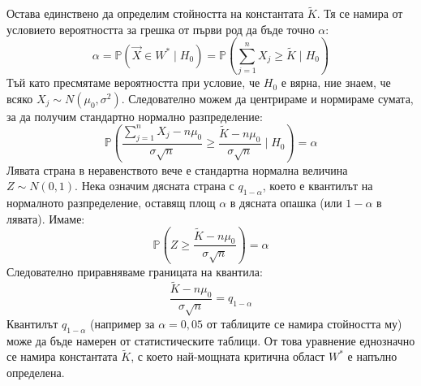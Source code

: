 \documentclass{article}
\begin{document}
Остава единствено да определим стойността на константата $\tilde{K}$. Тя се намира от условието вероятността за грешка от първи род да бъде точно $\alpha$:
\[
\alpha = \mathbb{P}(\vec{X} \in W^* \mid H_0) = \mathbb{P}\left( \sum_{j=1}^n X_j \ge \tilde{K} \mid H_0 \right)
\]
Тъй като пресмятаме вероятността при условие, че $H_0$ е вярна, ние знаем, че всяко $X_j \sim N(\mu_0, \sigma^2)$. Следователно можем да центрираме и нормираме сумата, за да получим стандартно нормално разпределение:
\[
\mathbb{P}\left( \frac{\sum_{j=1}^n X_j - n\mu_0}{\sigma\sqrt{n}} \ge \frac{\tilde{K} - n\mu_0}{\sigma\sqrt{n}} \mid H_0 \right) = \alpha
\]
Лявата страна в неравенството вече е стандартна нормална величина $Z \sim N(0,1)$. Нека означим дясната страна с $q_{1-\alpha}$, което е квантилът на нормалното разпределение, оставящ площ $\alpha$ в дясната опашка (или $1-\alpha$ в лявата). Имаме:
\[
\mathbb{P}\left( Z \ge \frac{\tilde{K} - n\mu_0}{\sigma\sqrt{n}} \right) = \alpha
\]
Следователно приравняваме границата на квантила:
\[
\frac{\tilde{K} - n\mu_0}{\sigma\sqrt{n}} = q_{1-\alpha}
\]
Квантилът $q_{1-\alpha}$ (например за $\alpha = 0,05$ от таблиците се намира стойността му) може да бъде намерен от статистическите таблици. От това уравнение еднозначно се намира константата $\tilde{K}$, с което най-мощната критична област $W^*$ е напълно определена.
\end{document}
